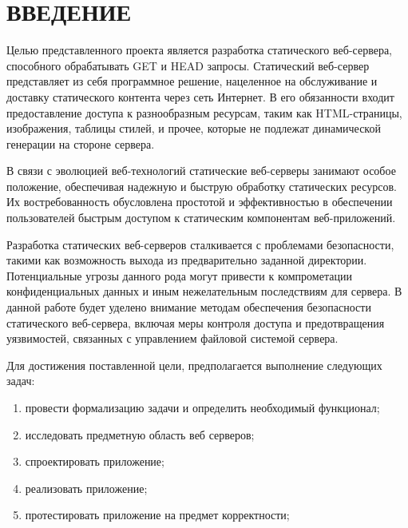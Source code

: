 \section*{\hfill{\centering ВВЕДЕНИЕ }\hfill}

Целью представленного проекта является разработка статического веб-сервера, способного обрабатывать GET и HEAD запросы. Статический веб-сервер представляет из себя программное решение, нацеленное на обслуживание и доставку статического контента через сеть Интернет. В его обязанности входит предоставление доступа к разнообразным ресурсам, таким как HTML-страницы, изображения, таблицы стилей, и прочее, которые не подлежат динамической генерации на стороне сервера.

В связи с эволюцией веб-технологий статические веб-серверы занимают особое положение, обеспечивая надежную и быструю обработку статических ресурсов. Их востребованность обусловлена простотой и эффективностью в обеспечении пользователей быстрым доступом к статическим компонентам веб-приложений.

Разработка статических веб-серверов сталкивается с проблемами безопасности, такими как возможность выхода из предварительно заданной директории. Потенциальные угрозы данного рода могут привести к компрометации конфиденциальных данных и иным нежелательным последствиям для сервера. В данной работе будет уделено внимание методам обеспечения безопасности статического веб-сервера, включая меры контроля доступа и предотвращения уязвимостей, связанных с управлением файловой системой сервера.

Для достижения поставленной цели, предполагается выполнение следующих задач:
\begin{enumerate}[label={\arabic*)}]
    \item провести формализацию задачи и определить необходимый функционал;
    \item исследовать предметную область веб серверов;
    \item спроектировать приложение;
    \item реализовать приложение;
    \item протестировать приложение на предмет корректности;
\end{enumerate}